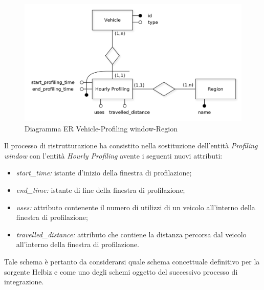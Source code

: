 \begin{figure}[H]                                                                                                                                                            
\centering                                                                                                                                                                   
\includegraphics[width=\textwidth]{diagrams/vehicle_hour_profiling_er}                                                                                                                                   
\caption{Diagramma ER Vehicle-Profiling window-Region}                                                                                                                                            
\label{fig:vehicle_hour_profiling_er}                                                                                                                                                           
\end{figure}

Il processo di ristrutturazione ha consistito nella sostituzione dell'entità
\textit{Profiling window} con l'entità \textit{Hourly Profiling} avente i
seguenti nuovi attributi:
\begin{itemize}
\item \textit{start\_time:} istante d'inizio della finestra di profilazione;
\item \textit{end\_time:} istante di fine della finestra di profilazione;
\item \textit{uses:} attributo contenente il numero di utilizzi di un
veicolo all'interno della finestra di profilazione;
\item \textit{travelled\_distance:} attributo che contiene la distanza 
percorsa dal veicolo all'interno della finestra di profilazione.
\end{itemize}
Tale schema è pertanto da considerarsi quale schema concettuale definitivo per la
sorgente Helbiz e come uno degli schemi oggetto del successivo processo di
integrazione.

